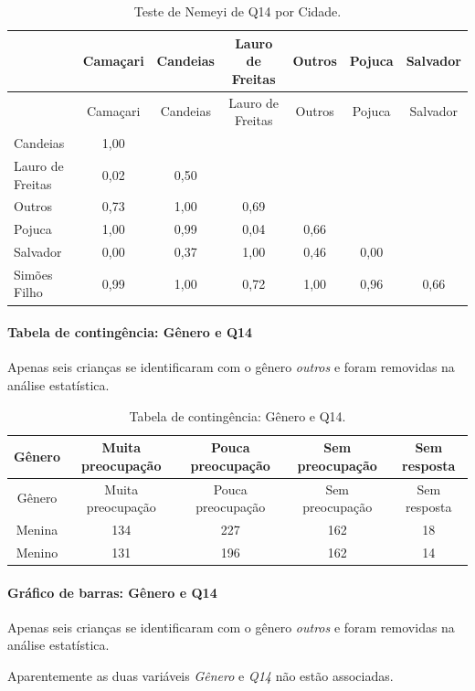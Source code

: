 \documentclass[]{article}
\let\oldparagraph\paragraph
\renewcommand{\paragraph}[1]{\oldparagraph{#1}\mbox{}}
\begin{document}
\begin{longtable}[]{@{}lcccccc@{}}
\caption{\label{tab:unnamed-chunk-66}Teste de Nemeyi de Q14 por Cidade.}\tabularnewline
\toprule
& Camaçari & Candeias & Lauro de Freitas & Outros & Pojuca & Salvador\tabularnewline
\midrule
\endfirsthead
\toprule
& Camaçari & Candeias & Lauro de Freitas & Outros & Pojuca & Salvador\tabularnewline
\midrule
\endhead
Candeias & 1,00 & & & & &\tabularnewline
Lauro de Freitas & 0,02 & 0,50 & & & &\tabularnewline
Outros & 0,73 & 1,00 & 0,69 & & &\tabularnewline
Pojuca & 1,00 & 0,99 & 0,04 & 0,66 & &\tabularnewline
Salvador & 0,00 & 0,37 & 1,00 & 0,46 & 0,00 &\tabularnewline
Simões Filho & 0,99 & 1,00 & 0,72 & 1,00 & 0,96 & 0,66\tabularnewline
\bottomrule
\end{longtable}

\cleardoublepage

\hypertarget{tabela-de-continguxeancia-guxeanero-e-q14}{%
\paragraph{Tabela de contingência: Gênero e Q14}\label{tabela-de-continguxeancia-guxeanero-e-q14}}

Apenas seis crianças se identificaram com o gênero \emph{outros} e foram removidas na análise estatística.

\begin{longtable}[]{@{}ccccc@{}}
\caption{\label{tab:unnamed-chunk-67}Tabela de contingência: Gênero e Q14.}\tabularnewline
\toprule
Gênero & Muita preocupação & Pouca preocupação & Sem preocupação & Sem resposta\tabularnewline
\midrule
\endfirsthead
\toprule
Gênero & Muita preocupação & Pouca preocupação & Sem preocupação & Sem resposta\tabularnewline
\midrule
\endhead
Menina & 134 & 227 & 162 & 18\tabularnewline
Menino & 131 & 196 & 162 & 14\tabularnewline
\bottomrule
\end{longtable}

\hypertarget{gruxe1fico-de-barras-guxeanero-e-q14}{%
\paragraph{Gráfico de barras: Gênero e Q14}\label{gruxe1fico-de-barras-guxeanero-e-q14}}

Apenas seis crianças se identificaram com o gênero \emph{outros} e foram removidas na análise estatística.

Aparentemente as duas variáveis \emph{Gênero} e \emph{Q14} não estão associadas.
\end{document}
